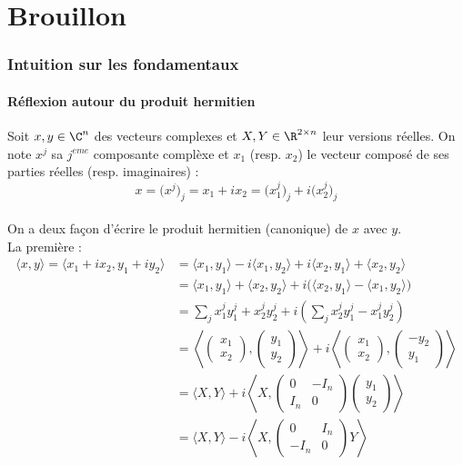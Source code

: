\setcounter{figure}{0}
\setcounter{lstlisting}{0}

\part{Brouillon}

\section{Intuition sur les fondamentaux}

\subsection{Réflexion autour du produit hermitien}

Soit $x,y\in\C^n$ des vecteurs complexes et $X,Y\in\R^{2\times n}$ leur versions réelles. On note $x^j$ sa $j^{eme}$ composante complèxe et $x_1$ (resp. $x_2$) le vecteur composé de ses parties réelles (resp. imaginaires) :
\[x = \big(x^j\big)_j =  x_1 + ix_2 =  \big(x^j_1\big)_j +i \big(x^j_2\big)_j\]
\\
On a deux façon d'écrire le produit hermitien (canonique) de $x$ avec $y$.
\\
La première :
\begin{align*}
\langle x,y \rangle = \langle x_1 + ix_2, y_1 + iy_2\rangle &= \langle x_1, y_1\rangle - i \langle x_1,y_2\rangle +i\langle x_2, y_1\rangle + \langle x_2, y_2\rangle  \\
&= \langle x_1, y_1\rangle + \langle x_2, y_2\rangle 
+ i\big(\langle x_2, y_1\rangle - \langle x_1,y_2\rangle\big) \\
&= \sum_j x^j_1 y^j_1+ x^j_2 y^j_2
+ i\left(\sum_j x^j_2 y^j_1 -  x^j_1y^j_2\right) \\
&= \left\langle \begin{pmatrix} x_1 \\ x_2 \end{pmatrix},\begin{pmatrix} y_1 \\ y_2 \end{pmatrix}\right\rangle
+ i\left\langle \begin{pmatrix} x_1 \\ x_2 \end{pmatrix},\begin{pmatrix} -y_2 \\ y_1 \end{pmatrix}\right\rangle \\
&= \Big\langle X,Y\Big\rangle 
+ i\left\langle X,\begin{pmatrix} 0 & -I_n \\ I_n & 0 \end{pmatrix}\begin{pmatrix} y_1 \\ y_2 \end{pmatrix}\right\rangle\\
&= \Big\langle X,Y\Big\rangle 
- i\left\langle X,\begin{pmatrix} 0 & I_n \\ -I_n & 0 \end{pmatrix}Y\right\rangle
\end{align*}
